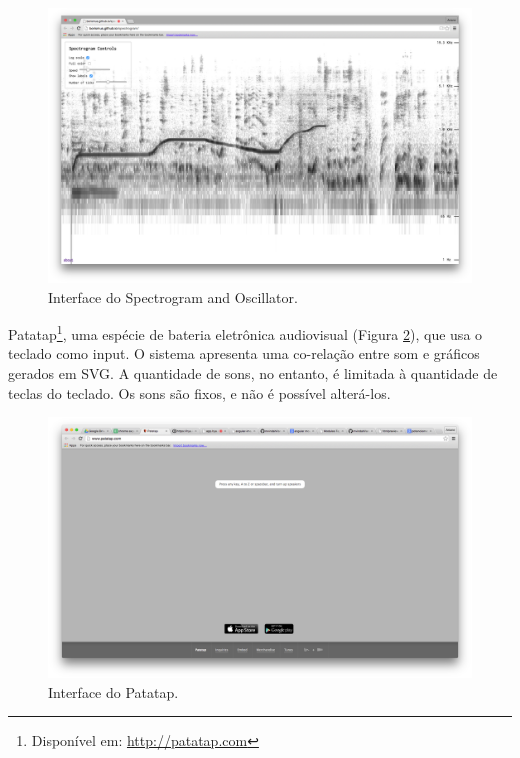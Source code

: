 \begin{figure}
    \caption{\label{spectrogramosc}Interface do Spectrogram and Oscillator.}
    
        \includegraphics[width=1\linewidth]{pictures/cap2/spectrogramandoscilator}
    
\end{figure}

Patatap\footnote{Disponível em: \url{http://patatap.com}}, uma espécie de bateria eletrônica audiovisual (Figura \ref{patatap}), que usa o teclado como input. O sistema apresenta uma co-relação entre som e gráficos gerados em SVG. A quantidade de sons, no entanto, é limitada à quantidade de teclas do teclado. Os sons são fixos, e não é possível alterá-los.

\begin{figure}
    \caption{\label{patatap}Interface do Patatap.}
    
        \includegraphics[width=1\linewidth]{pictures/cap2/patatap}
    
\end{figure}

